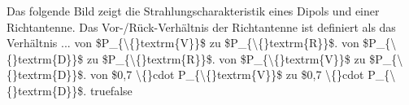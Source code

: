     {Das folgende Bild zeigt die Strahlungscharakteristik eines Dipols und einer Richtantenne. Das Vor-/Rück-Verhältnis der Richtantenne ist definiert als das Verhältnis ...}
    {von \$P\_\{\textbackslash\{\}textrm\{V\}\}\$ zu \$P\_\{\textbackslash\{\}textrm\{R\}\}\$.}
    {von \$P\_\{\textbackslash\{\}textrm\{D\}\}\$ zu \$P\_\{\textbackslash\{\}textrm\{R\}\}\$.}
    {von \$P\_\{\textbackslash\{\}textrm\{V\}\}\$ zu \$P\_\{\textbackslash\{\}textrm\{D\}\}\$.}
    {von \$0,7 \textbackslash\{\}cdot P\_\{\textbackslash\{\}textrm\{V\}\}\$ zu \$0,7 \textbackslash\{\}cdot P\_\{\textbackslash\{\}textrm\{D\}\}\$.}
    {true}{false}